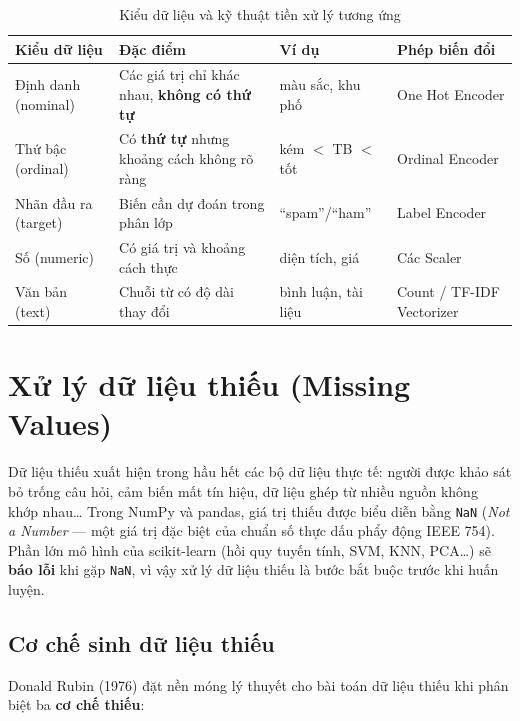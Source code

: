 \begin{table}[H]
\centering
\begin{tabular}{|p{2.8cm}|p{4.2cm}|p{3cm}|p{3.4cm}|}
\hline
\textbf{Kiểu dữ liệu} & \textbf{Đặc điểm} & \textbf{Ví dụ} & \textbf{Phép biến đổi} \\
\hline
Định danh (nominal) & Các giá trị chỉ khác nhau, \textbf{không có thứ tự} & màu sắc, khu phố & One Hot Encoder \\
\hline
Thứ bậc (ordinal) & Có \textbf{thứ tự} nhưng khoảng cách không rõ ràng & kém $<$ TB $<$ tốt & Ordinal Encoder \\
\hline
Nhãn đầu ra (target) & Biến cần dự đoán trong phân lớp & ``spam''/``ham'' & Label Encoder \\
\hline
Số (numeric) & Có giá trị và khoảng cách thực & diện tích, giá & Các Scaler \\
\hline
Văn bản (text) & Chuỗi từ có độ dài thay đổi & bình luận, tài liệu & Count / TF-IDF Vectorizer \\
\hline
\end{tabular}
\caption{Kiểu dữ liệu và kỹ thuật tiền xử lý tương ứng}
\label{tab:datatypes}
\end{table}

\section{Xử lý dữ liệu thiếu (Missing Values)}
\label{sec:missing}

Dữ liệu thiếu xuất hiện trong hầu hết các bộ dữ liệu thực tế: người được khảo sát bỏ trống câu hỏi, cảm biến mất tín hiệu, dữ liệu ghép từ nhiều nguồn không khớp nhau\ldots{} Trong NumPy và pandas, giá trị thiếu được biểu diễn bằng \texttt{NaN} (\textit{Not a Number} --- một giá trị đặc biệt của chuẩn số thực dấu phẩy động IEEE 754). Phần lớn mô hình của scikit-learn (hồi quy tuyến tính, SVM, KNN, PCA\ldots) sẽ \textbf{báo lỗi} khi gặp \texttt{NaN}, vì vậy xử lý dữ liệu thiếu là bước bắt buộc trước khi huấn luyện.

\subsection{Cơ chế sinh dữ liệu thiếu}

Donald Rubin (1976) đặt nền móng lý thuyết cho bài toán dữ liệu thiếu khi phân biệt ba \textbf{cơ chế thiếu}:

